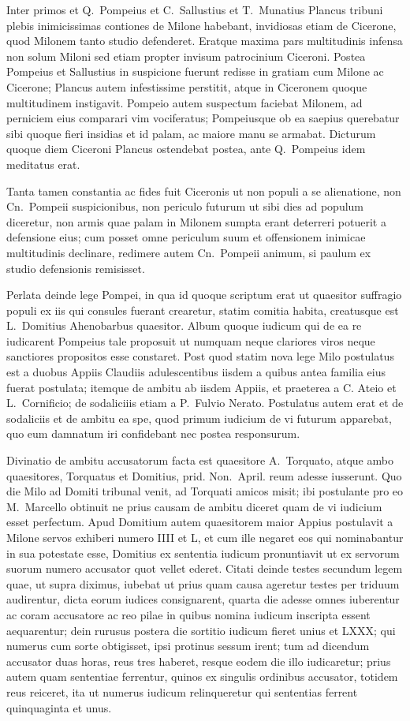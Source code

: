 Inter primos et Q.~Pompeius et C.~Sallustius et T.~Munatius Plancus tribuni plebis inimicissimas contiones de Milone habebant, invidiosas etiam de Cicerone, quod Milonem tanto studio defenderet. Eratque maxima pars multitudinis infensa non solum Miloni sed etiam propter invisum patrocinium Ciceroni. Postea Pompeius et Sallustius in suspicione fuerunt redisse in gratiam cum Milone ac Cicerone; Plancus autem infestissime perstitit, atque in Ciceronem quoque multitudinem instigavit. Pompeio autem suspectum faciebat Milonem, ad perniciem eius comparari vim vociferatus; Pompeiusque ob ea saepius querebatur sibi quoque fieri insidias et id palam, ac maiore manu se armabat. Dicturum quoque diem Ciceroni Plancus ostendebat postea, ante Q.~Pompeius idem meditatus erat. 

Tanta tamen constantia ac fides fuit Ciceronis ut non populi a se alienatione, non Cn.~Pompeii suspicionibus, non periculo futurum ut sibi dies ad populum diceretur, non armis quae palam in Milonem sumpta erant deterreri potuerit a defensione eius; cum posset omne periculum suum et offensionem inimicae multitudinis declinare, redimere autem Cn.~Pompeii animum, si paulum ex studio defensionis remisisset.

Perlata deinde lege Pompei, in qua id quoque scriptum erat ut quaesitor suffragio populi ex iis qui consules fuerant crearetur, statim comitia habita, creatusque est L.~Domitius Ahenobarbus quaesitor. Album quoque iudicum qui de ea re iudicarent Pompeius tale proposuit ut numquam neque clariores viros neque sanctiores propositos esse constaret. Post quod statim nova lege Milo postulatus est a duobus Appiis Claudiis adulescentibus iisdem a quibus antea familia eius fuerat postulata; itemque de ambitu ab iisdem Appiis, et praeterea a C. Ateio et L.~Cornificio; de sodaliciiis etiam a P.~Fulvio Nerato. Postulatus autem erat et de sodaliciis et de ambitu ea spe, quod primum iudicium de vi futurum apparebat, quo eum damnatum iri confidebant nec postea responsurum.

Divinatio de ambitu accusatorum facta est quaesitore A.~Torquato, atque ambo quaesitores, Torquatus et Domitius, prid. Non.~April. reum adesse iusserunt. Quo die Milo ad Domiti tribunal venit, ad Torquati amicos misit; ibi postulante pro eo M.~Marcello obtinuit ne prius causam de ambitu diceret quam de vi iudicium esset perfectum. Apud Domitium autem quaesitorem maior Appius postulavit a Milone servos exhiberi numero IIII et L, et cum ille negaret eos qui nominabantur in sua potestate esse, Domitius ex sententia iudicum pronuntiavit ut ex servorum suorum numero accusator quot vellet ederet. Citati deinde testes secundum legem quae, ut supra diximus, iubebat ut prius quam causa ageretur testes per triduum audirentur, dicta eorum iudices consignarent, quarta die adesse omnes iuberentur ac coram accusatore ac reo pilae in quibus nomina iudicum inscripta essent aequarentur; dein rurusus postera die sortitio iudicum fieret unius et LXXX; qui numerus cum sorte obtigisset, ipsi protinus sessum irent; tum ad dicendum accusator duas horas, reus tres haberet, resque eodem die illo iudicaretur; prius autem quam sententiae ferrentur, quinos ex singulis ordinibus accusator, totidem reus reiceret, ita ut numerus iudicum relinqueretur qui sententias ferrent quinquaginta et unus.

